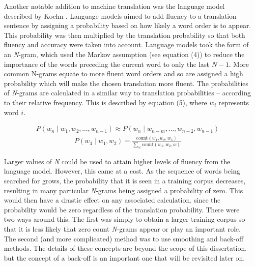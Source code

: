 \documentclass[11pt]{article}
\begin{document}
Another notable addition to machine translation was the language model described by Koehn \citeyearpar[ch. 7]{koehn2010}. Language models aimed to add fluency to a translation sentence by assigning a probability based on how likely a word order is to appear. This probability was then multiplied by the translation probability so that both fluency and accuracy were taken into account. Language models took the form of an \textit{N}-gram, which used the Markov assumption (see equation (4)) to reduce the importance of the words preceding the current word to only the last $N-1$. More common N-grams equate to more fluent word orders and so are assigned a high probability which will make the chosen translation more fluent. The probabilities of \textit{N}-grams are calculated in a similar way to translation probabilities -- according to their relative frequency. This is described by equation (5), where $w_i$ represents word $i$.

\begin{align}
    P(w_n \mid w_1, w_2, \dots, w_{n-1}) \approx P(w_n \mid w_{n-m}, \dots, w_{n-2}, w_{n-1})
\end{align}
\begin{align}
    P(w_3 \mid w_1, w_2) = \frac{\textrm{count}(w_1, w_2, w_3)}{\sum_w \textrm{count}(w_1, w_2, w)}
\end{align}

\bigskip

Larger values of \textit{N} could be used to attain higher levels of fluency from the language model. However, this came at a cost. As the sequence of words being searched for grows, the probability that it is seen in a training corpus decreases, resulting in many particular \textit{N}-grams being assigned a probability of zero. This would then have a drastic effect on any associated calculation, since the probability would be zero regardless of the translation probability. There were two ways around this. The first was simply to obtain a larger training corpus so that it is less likely that zero count \textit{N}-grams appear or play an important role. The second (and more complicated) method was to use smoothing and back-off methods. The details of these concepts are beyond the scope of this dissertation, but the concept of a back-off is an important one that will be revisited later on.

\bigskip
\end{document}
